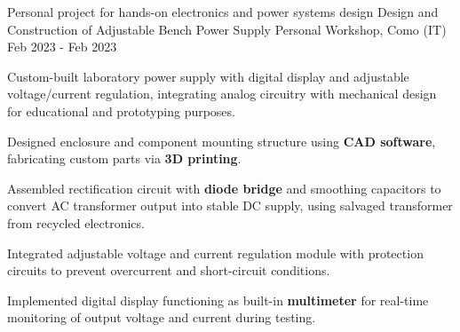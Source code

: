 
\cventry
{Personal project for hands-on electronics and power systems design}
{Design and Construction of Adjustable Bench Power Supply}
{Personal Workshop, Como (IT)}
{Feb 2023 - Feb 2023}
{
    Custom-built laboratory power supply with digital display and adjustable voltage/current regulation, integrating analog circuitry with mechanical design for educational and prototyping purposes.
    \newline
    \vspace{4mm}
    \begin{cvitems}
        \item {Designed enclosure and component mounting structure using \textbf{CAD software}, fabricating custom parts via \textbf{3D printing}.}
        \item {Assembled rectification circuit with \textbf{diode bridge} and smoothing capacitors to convert AC transformer output into stable DC supply, using salvaged transformer from recycled electronics.}
        \item {Integrated adjustable voltage and current regulation module with protection circuits to prevent overcurrent and short-circuit conditions.}
        \item {Implemented digital display functioning as built-in \textbf{multimeter} for real-time monitoring of output voltage and current during testing.}
    \end{cvitems}
}
